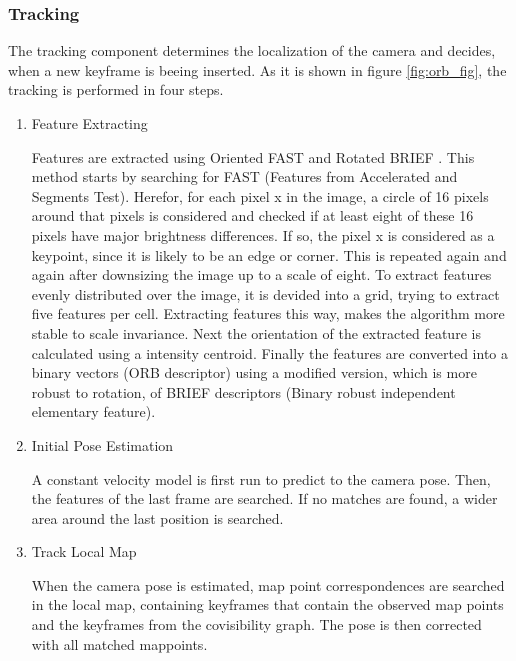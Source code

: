 	
	\subsubsection{Tracking}
	
	The tracking component determines the localization of the camera and decides, when a new keyframe is beeing inserted.
	As it is shown in figure \ref{fig:orb_fig}, the tracking is performed in four steps.
	
	\begin{enumerate}
	\item Feature Extracting 
	
	Features are extracted using Oriented FAST and Rotated BRIEF \cite{orb_feat}. This method starts by searching for 
	FAST (Features from Accelerated and Segments Test). Herefor, for each pixel x in the image, a circle of 16 pixels around that pixels
	is considered and checked if at least eight of these 16 pixels have major brightness differences. If so, the pixel x is considered as 
	a keypoint, since it is likely to be an edge or corner. This is repeated again and again after downsizing the image up to a scale of eight. 
	To extract features evenly distributed over the image, it is devided into a grid, trying to extract five features per cell. 
	Extracting features this way, makes the algorithm more stable to scale invariance. 
	Next the orientation of the extracted feature is calculated using a intensity centroid. 
	Finally the features are converted into a binary vectors (ORB descriptor) using a modified version, which is more robust to rotation, of BRIEF descriptors (Binary robust independent elementary feature).
	
	
	
	\item Initial Pose Estimation
	
	A constant velocity model is first run to predict to the camera pose. Then, the features of the last frame are searched. If no matches are found, 
	a wider area around the last position is searched. 
	
	\item Track Local Map 
	
	When the camera pose is estimated, map point correspondences are searched in 
	the local map, containing keyframes that contain the observed map points and
	the keyframes from the covisibility graph. The pose is then corrected with all
	matched mappoints. 
	

\end{enumerate}

